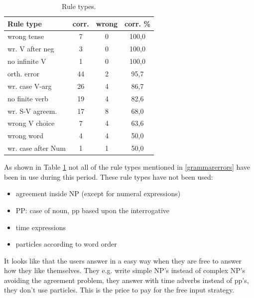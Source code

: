 \documentclass[11pt]{article}
\begin{document}
\begin{table}[htbp]
\begin{tabular}{|l|c|c|c|}
\hline 
\textbf{Rule type}  & \textbf{corr.} & \textbf{wrong}   & \textbf{corr. \% }  \\
\hline 
wrong tense         & 7     & 0     & 100,0     \\ 
wr. V after neg   & 3     & 0     & 100,0     \\ 
no infinite V       & 1     & 0     & 100,0     \\ 
\hline 
orth. error         & 44    & 2     & 95,7      \\
wr. case V-arg  & 26    & 4     & 86,7      \\
no finite verb        & 19    & 4     &  82,6 \\
\hline 
wr. S-V agreem.   & 17    & 8     & 68,0 \\
wrong V choice        & 7     & 4     & 63,6 \\
\hline 
wrong word            & 4     & 4     & 50,0 \\
wr. case after Num  & 1     & 1     & 50,0 \\
\hline
\end{tabular}
\caption{Rule types.}
\label{ruletypes}
\end{table}

As shown in Table \ref{ruletypes} not all of the rule types mentioned in \ref{grammarerrors} have been in use during this period. These rule types have not been used:

\begin{itemize}
\setlength{\itemsep}{-0.7cm}
\item agreement inside NP (except for numeral expressions) \\
\item PP: case of noun, pp based upon the interrogative  \\
\item time expressions \\
\item particles according to word order \\
\end{itemize}


It looks like that the users answer in a easy way when they are free to answer how they like themselves. They e.g. write simple NP's instead of complex NP's avoiding the agreement problem, they answer with time adverbs instead of pp's, they don't use particles. This is the price to pay for the free input strategy.  \\
\end{document}
